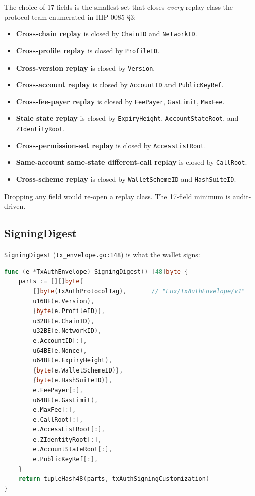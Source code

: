The choice of 17 fields is the smallest set that closes \emph{every} replay
class the protocol team enumerated in HIP-0085 §3:

\begin{itemize}[leftmargin=2em,nosep]
  \item \textbf{Cross-chain replay} is closed by \texttt{ChainID} and
    \texttt{NetworkID}.
  \item \textbf{Cross-profile replay} is closed by \texttt{ProfileID}.
  \item \textbf{Cross-version replay} is closed by \texttt{Version}.
  \item \textbf{Cross-account replay} is closed by \texttt{AccountID} and
    \texttt{PublicKeyRef}.
  \item \textbf{Cross-fee-payer replay} is closed by \texttt{FeePayer},
    \texttt{GasLimit}, \texttt{MaxFee}.
  \item \textbf{Stale state replay} is closed by \texttt{ExpiryHeight},
    \texttt{AccountStateRoot}, and \texttt{ZIdentityRoot}.
  \item \textbf{Cross-permission-set replay} is closed by
    \texttt{AccessListRoot}.
  \item \textbf{Same-account same-state different-call replay} is closed by
    \texttt{CallRoot}.
  \item \textbf{Cross-scheme replay} is closed by \texttt{WalletSchemeID}
    and \texttt{HashSuiteID}.
\end{itemize}

Dropping any field would re-open a replay class. The 17-field minimum is
audit-driven.

\subsection{SigningDigest}

\texttt{SigningDigest} (\texttt{tx\_envelope.go:148}) is what the wallet signs:

\begin{lstlisting}[language=Go,caption={\texttt{SigningDigest} construction.
Source: \texttt{protocol/auth/tx\_envelope.go:148}. Hash family is cSHAKE256
under \texttt{LUX\_TX\_AUTH\_V1}, independent of \texttt{HashSuiteID} which
is bound as data into the transcript.}]
func (e *TxAuthEnvelope) SigningDigest() [48]byte {
    parts := [][]byte{
        []byte(txAuthProtocolTag),       // "Lux/TxAuthEnvelope/v1"
        u16BE(e.Version),
        {byte(e.ProfileID)},
        u32BE(e.ChainID),
        u32BE(e.NetworkID),
        e.AccountID[:],
        u64BE(e.Nonce),
        u64BE(e.ExpiryHeight),
        {byte(e.WalletSchemeID)},
        {byte(e.HashSuiteID)},
        e.FeePayer[:],
        u64BE(e.GasLimit),
        e.MaxFee[:],
        e.CallRoot[:],
        e.AccessListRoot[:],
        e.ZIdentityRoot[:],
        e.AccountStateRoot[:],
        e.PublicKeyRef[:],
    }
    return tupleHash48(parts, txAuthSigningCustomization)
}
\end{lstlisting}

